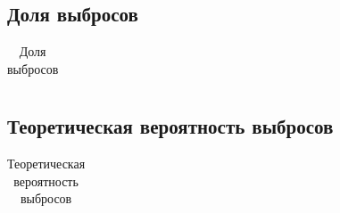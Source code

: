 \documentclass[a4paper]{article}
\begin{document}
\subsection{Доля выбросов}
\begin{table}[H]
    \centering
    \begin{tabular}{|c|c|}
        \hline
        
    \end{tabular}
    \caption{Доля выбросов}
    \label{tab:outlierstests}
\end{table}
\subsection{Теоретическая вероятность выбросов}
\begin{table}[H]
    \centering
    \begin{tabular}{|c|c|c|c|c|c|}
        \hline
        
    \end{tabular}
    \caption{Теоретическая вероятность выбросов}
    \label{tab:outlierstheory}
\end{table}
\end{document}
